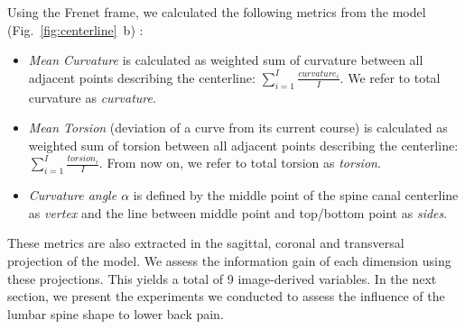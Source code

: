 \documentclass[a4paper,twoside]{style/article}
\newcommand{\com}[1]{\textcolor{orange}{\uline{#1}}}
\begin{document}
Using the Frenet frame, we calculated the following metrics from the model (Fig.~\ref{fig:centerline}~b) \cite{Frenet}:
\begin{itemize}
	\item \emph{Mean Curvature} is calculated as weighted sum of curvature between all adjacent points describing the centerline: $\sum_{i=1}^I \frac{curvature_i}{I}$. We refer to total curvature as \emph{curvature}.
	\item \emph{Mean Torsion} (deviation of a curve from its current course) is calculated as weighted sum of torsion between all adjacent points describing the centerline: $\sum_{i=1}^I \frac{torsion_i}{I}$. From now on, we refer to total torsion as \emph{torsion}.
	\item \emph{Curvature angle $\alpha$} is defined by the middle point of the spine canal centerline as \emph{vertex} and the line between middle point and top/bottom point as \emph{sides}.
\end{itemize}
These metrics are also extracted in the sagittal, coronal and transversal projection of the model.
We assess the information gain of each dimension using these projections.
This yields a total of 9 image-derived variables.
In the next section, we present the experiments we conducted to assess the influence of the lumbar spine shape to lower back pain.


\end{document}
